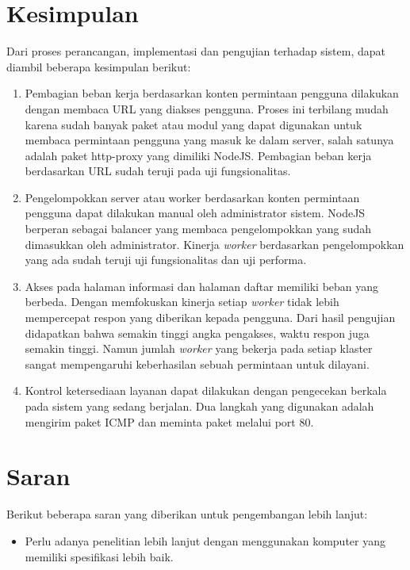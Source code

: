\documentclass{ta-its}
\begin{document}
			\section{Kesimpulan}
				Dari proses perancangan, implementasi dan pengujian terhadap sistem, dapat diambil beberapa kesimpulan berikut:
				\begin{enumerate}
					\item Pembagian beban kerja berdasarkan konten permintaan pengguna dilakukan dengan membaca URL yang diakses pengguna. Proses ini terbilang mudah karena sudah banyak paket atau modul yang dapat digunakan untuk membaca permintaan pengguna yang masuk ke dalam server, salah satunya adalah paket http-proxy yang dimiliki NodeJS. Pembagian beban kerja berdasarkan URL sudah teruji pada uji fungsionalitas.
					\item Pengelompokkan server atau worker berdasarkan konten permintaan pengguna dapat dilakukan manual oleh administrator sistem. NodeJS berperan sebagai balancer yang membaca pengelompokkan yang sudah dimasukkan oleh administrator. Kinerja \textit{worker} berdasarkan pengelompokkan yang ada sudah teruji uji fungsionalitas dan uji performa.
					\item Akses pada halaman informasi dan halaman daftar memiliki beban yang berbeda. Dengan memfokuskan kinerja setiap \textit{worker} tidak lebih mempercepat respon yang diberikan kepada pengguna. Dari hasil pengujian didapatkan bahwa semakin tinggi angka pengakses, waktu respon juga semakin tinggi. Namun jumlah \textit{worker} yang bekerja pada setiap klaster sangat mempengaruhi keberhasilan sebuah permintaan untuk dilayani.
					\item Kontrol ketersediaan layanan dapat dilakukan dengan pengecekan berkala pada sistem yang sedang berjalan. Dua langkah yang digunakan adalah mengirim paket ICMP dan meminta paket melalui port 80. 
				\end{enumerate}
			
			\section{Saran}
				Berikut beberapa saran yang diberikan untuk pengembangan lebih lanjut:
				\begin{itemize}
					\item Perlu adanya penelitian lebih lanjut dengan menggunakan komputer yang memiliki spesifikasi lebih baik. 
				\end{itemize}
				
\end{document}
